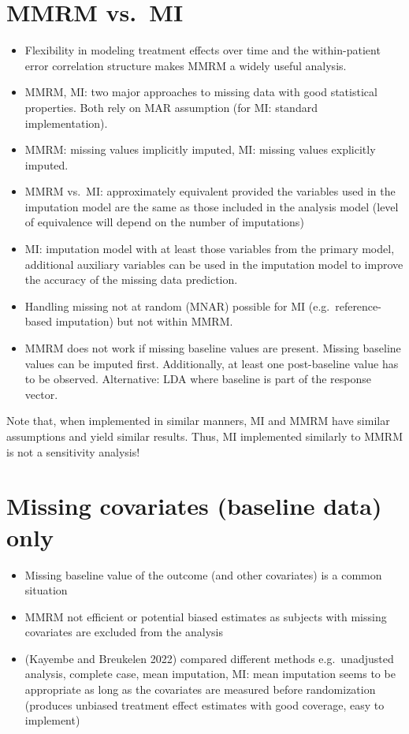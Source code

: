 \documentclass[
  letterpaper,
  DIV=11,
  numbers=noendperiod]{scrreprt}
\providecommand{\tightlist}{%
  \setlength{\itemsep}{0pt}\setlength{\parskip}{0pt}}\usepackage{longtable,booktabs,array}
\begin{document}
\hypertarget{mmrm-vs.-mi}{%
\section{MMRM vs.~MI}\label{mmrm-vs.-mi}}

\begin{itemize}
\tightlist
\item
  Flexibility in modeling treatment effects over time and the
  within-patient error correlation structure makes MMRM a widely useful
  analysis.
\item
  MMRM, MI: two major approaches to missing data with good statistical
  properties. Both rely on MAR assumption (for MI: standard
  implementation).
\item
  MMRM: missing values implicitly imputed, MI: missing values explicitly
  imputed.
\item
  MMRM vs.~MI: approximately equivalent provided the variables used in
  the imputation model are the same as those included in the analysis
  model (level of equivalence will depend on the number of imputations)
\item
  MI: imputation model with at least those variables from the primary
  model, additional auxiliary variables can be used in the imputation
  model to improve the accuracy of the missing data prediction.
\item
  Handling missing not at random (MNAR) possible for MI
  (e.g.~reference-based imputation) but not within MMRM.
\item
  MMRM does not work if missing baseline values are present. Missing
  baseline values can be imputed first. Additionally, at least one
  post-baseline value has to be observed. Alternative: LDA where
  baseline is part of the response vector.
\end{itemize}

Note that, when implemented in similar manners, MI and MMRM have similar
assumptions and yield similar results. Thus, MI implemented similarly to
MMRM is not a sensitivity analysis!

\hypertarget{missing-covariates-baseline-data-only}{%
\section{Missing covariates (baseline data)
only}\label{missing-covariates-baseline-data-only}}

\begin{itemize}
\tightlist
\item
  Missing baseline value of the outcome (and other covariates) is a
  common situation
\item
  MMRM not efficient or potential biased estimates as subjects with
  missing covariates are excluded from the analysis
\item
  (Kayembe and Breukelen 2022) compared different methods
  e.g.~unadjusted analysis, complete case, mean imputation, MI: mean
  imputation seems to be appropriate as long as the covariates are
  measured before randomization (produces unbiased treatment effect
  estimates with good coverage, easy to implement)
\end{itemize}
\end{document}
